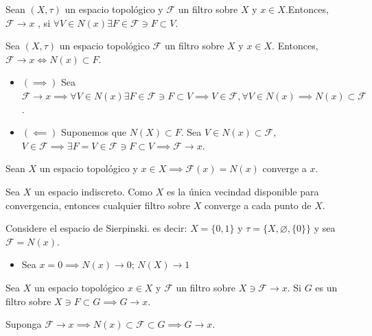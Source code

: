 \begin{definicion}
    Sean $(X,\tau)$ un espacio topológico y $\mathcal{F}$ un filtro sobre $X$ y $x\in X$.Entonces, $\mathcal{F}\to x$
    , si $\forall V\in N(x)\exists F\in \mathcal{F}\ni F\subset V$.
\end{definicion}

\begin{teorema}
    Sea $(X,\tau)$ un espacio topológico $\mathcal{F}$ un filtro sobre $X$ y $x\in X$. Entonces, $\mathcal{F}\to x\iff N(x)\subset F$. 
    \begin{dem}
        \begin{itemize}
            \item $(\implies)$ Sea $\mathcal{F}\to x\implies \forall V\in N(x)\exists F\in \mathcal{F}\ni F\subset V\implies V\in \mathcal{F},\forall V\in N(x)\implies N(x)\subset \mathcal{F}$. 
            \item $(\impliedby)$ Suponemos que $N(X)\subset F$. Sea $V\in N(x)\subset \mathcal{F}$, $V\in \mathcal{F}\implies \exists F=V\in \mathcal{F}\ni F\subset V\implies \mathcal{F}\to x$. 
        \end{itemize}
    \end{dem}
\end{teorema}

\begin{ejemplo}
    Sean $X$ un espacio topológico y $x\in X\implies \mathcal{F}(x)=N(x)$ converge a $x$. 
\end{ejemplo}

\begin{ejemplo}
    Sea $X$ un espacio indiscreto. Como $X$ es la única vecindad disponible para convergencia, entonces cualquier filtro sobre $X$ converge a cada punto de $X$. 
\end{ejemplo}

\begin{ejemplo}
    Considere el espacio de Sierpinski. es decir: $X=\{0,1\}$ y $\tau=\{X,\varnothing, \{0\}\}$ y sea $\mathcal{F}=N(x)$. 
    \begin{itemize}
        \item Sea $x=0\implies N(x)\to 0$; $N(X)\to 1$
    \end{itemize}
\end{ejemplo}

\begin{teorema}
    Sea $X$ un espacio topológico $x\in X$ y $\mathcal{F}$ un filtro sobre $X\ni \mathcal{F}\to x$. Si $G$ es un filtro sobre $X\ni F\subset G\implies G\to x$. 
    \begin{dem}
        Suponga $\mathcal{F}\to x\implies N(x)\subset \mathcal{F}\subset G\implies G\to x$. 
    \end{dem}  
\end{teorema}

